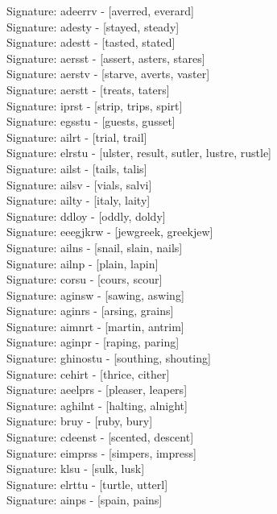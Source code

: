 Signature: {adeerrv} - [averred, everard] \\
Signature: {adesty} - [stayed, steady] \\
Signature: {adestt} - [tasted, stated] \\
Signature: {aersst} - [assert, asters, stares] \\
Signature: {aerstv} - [starve, averts, vaster] \\
Signature: {aerstt} - [treats, taters] \\
Signature: {iprst} - [strip, trips, spirt] \\
Signature: {egsstu} - [guests, gusset] \\
Signature: {ailrt} - [trial, trail] \\
Signature: {elrstu} - [ulster, result, sutler, lustre, rustle] \\
Signature: {ailst} - [tails, talis] \\
Signature: {ailsv} - [vials, salvi] \\
Signature: {ailty} - [italy, laity] \\
Signature: {ddloy} - [oddly, doldy] \\
Signature: {eeegjkrw} - [jewgreek, greekjew] \\
Signature: {ailns} - [snail, slain, nails] \\
Signature: {ailnp} - [plain, lapin] \\
Signature: {corsu} - [cours, scour] \\
Signature: {aginsw} - [sawing, aswing] \\
Signature: {aginrs} - [arsing, grains] \\
Signature: {aimnrt} - [martin, antrim] \\
Signature: {aginpr} - [raping, paring] \\
Signature: {ghinostu} - [southing, shouting] \\
Signature: {cehirt} - [thrice, cither] \\
Signature: {aeelprs} - [pleaser, leapers] \\
Signature: {aghilnt} - [halting, alnight] \\
Signature: {bruy} - [ruby, bury] \\
Signature: {cdeenst} - [scented, descent] \\
Signature: {eimprss} - [simpers, impress] \\
Signature: {klsu} - [sulk, lusk] \\
Signature: {elrttu} - [turtle, utterl] \\
Signature: {ainps} - [spain, pains] \\
